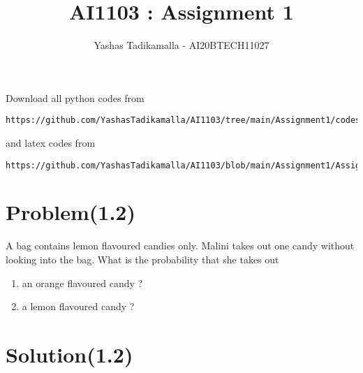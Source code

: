 \documentclass[journal,12pt,twocolumn]{IEEEtran}
\begin{document}
     \def\rightbox#1{\makebox[0in][r]{#1}}
     \def\centbox#1{\makebox[0in]{#1}}
     \def\topbox#1{\raisebox{-\baselineskip}[0in][0in]{#1}}
     \def\midbox#1{\raisebox{-0.5\baselineskip}[0in][0in]{#1}}
\vspace{3cm}
\title{AI1103 : Assignment 1}
\author{Yashas Tadikamalla - AI20BTECH11027}
\maketitle
\newpage
\bigskip
\renewcommand{\thefigure}{\theenumi}
\renewcommand{\thetable}{\theenumi}
Download all python codes from 
\begin{lstlisting}
https://github.com/YashasTadikamalla/AI1103/tree/main/Assignment1/codes
\end{lstlisting}
%
and latex codes from 
%
\begin{lstlisting}
https://github.com/YashasTadikamalla/AI1103/blob/main/Assignment1/Assignment1.tex
\end{lstlisting}
\section*{Problem(1.2)}
A bag contains lemon flavoured candies only. Malini takes out one candy without looking into the bag. What is the probability that she takes out
\begin{enumerate}
    \item an orange flavoured candy ?
    \item a lemon flavoured candy ?
\end{enumerate}
\section*{Solution(1.2)}
\end{document}
